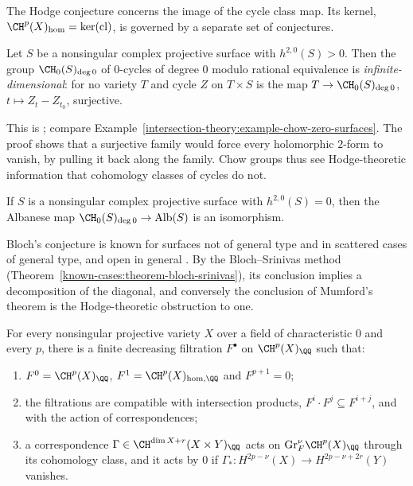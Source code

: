 The Hodge conjecture concerns the image of the cycle class map. Its kernel, $\CH^p(X)_{\mathrm{hom}} = \ker(\mathrm{cl})$, is governed by a separate set of conjectures.

\begin{theorem}[Mumford]\label{absolute-hodge:theorem-mumford}
Let $S$ be a nonsingular complex projective surface with $h^{2,0}(S) > 0$. Then the group $\CH_0(S)_{\deg 0}$ of $0$-cycles of degree $0$ modulo rational equivalence is \emph{infinite-dimensional}: for no
variety $T$ and cycle $Z$ on $T \times S$ is the map $T \to \CH_0(S)_{\deg 0}$, $t \mapsto Z_t - Z_{t_0}$, surjective.
\end{theorem}

This is \cite{mumford-1968}; compare Example~\ref{intersection-theory:example-chow-zero-surfaces}. The proof shows that a surjective family would force every holomorphic $2$-form to vanish, by pulling
it back along the family. Chow groups thus see Hodge-theoretic information that cohomology classes of cycles do not.

\begin{conjecture}[Bloch]\label{absolute-hodge:conjecture-bloch}
If $S$ is a nonsingular complex projective surface with $h^{2,0}(S) = 0$, then the Albanese map $\CH_0(S)_{\deg 0} \to \mathrm{Alb}(S)$ is an isomorphism.
\end{conjecture}

Bloch's conjecture is known for surfaces not of general type \cite{bloch-kas-lieberman-1976} and in scattered cases of general type, and open in general \cite{bloch-lectures}. By the Bloch--Srinivas method
(Theorem~\ref{known-cases:theorem-bloch-srinivas}), its conclusion implies a decomposition of the diagonal, and conversely the conclusion of Mumford's theorem is the Hodge-theoretic obstruction to one.

\begin{conjecture}\label{absolute-hodge:conjecture-bloch-beilinson}
For every nonsingular projective variety $X$ over a field of characteristic $0$ and every $p$, there is a finite decreasing filtration $F^\bullet$ on $\CH^p(X)_\QQ$ such that:
\begin{enumerate}
\item $F^0 = \CH^p(X)_\QQ$, $F^1 = \CH^p(X)_{\mathrm{hom},\QQ}$ and $F^{p+1} = 0$;
\item the filtrations are compatible with intersection products, $F^i \cdot F^j \subseteq F^{i+j}$, and with the action of correspondences;
\item a correspondence $\Gamma \in \CH^{\dim X + r}(X \times Y)_\QQ$ acts on $\mathrm{Gr}^\nu_F\CH^p(X)_\QQ$ through its cohomology class, and it acts by $0$ if $\Gamma_* \colon H^{2p-\nu}(X) \to H^{2p-\nu+2r}(Y)$ vanishes.
\end{enumerate}
\end{conjecture}


